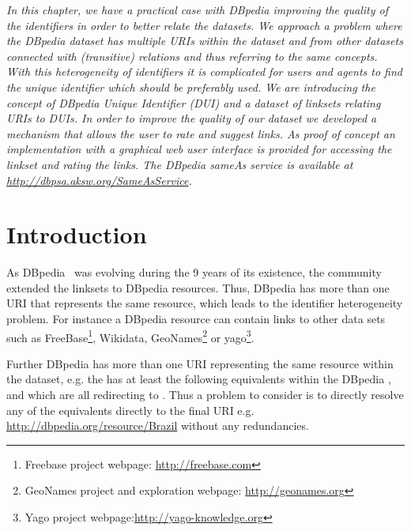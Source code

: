 \textit{In this chapter, we have a practical case with DBpedia improving the quality of the identifiers in order to better relate the datasets. We approach a problem where the DBpedia dataset has multiple URIs within the dataset and from other datasets connected with (transitive)  relations and thus referring to the same concepts.
With this heterogeneity of identifiers it is complicated for users and agents to find the unique identifier which should be preferably used.
We are introducing the concept of DBpedia Unique Identifier (DUI) and a dataset of linksets relating URIs to DUIs.
In order to improve the quality of our dataset we developed a mechanism that allows the user to rate and suggest links.
As proof of concept an implementation with a graphical web user interface is provided for accessing the linkset and rating the links.
The DBpedia sameAs service is available at \url{http://dbpsa.aksw.org/SameAsService}.}

\section{Introduction}


As DBpedia~\cite{dbpedia-swj} was evolving during the 9 years of its existence, the community extended the linksets to DBpedia resources.
Thus, DBpedia has more than one URI that represents the same resource, which leads to the identifier heterogeneity problem. 
For instance a DBpedia resource can contain  links to other data sets such as FreeBase\footnote{Freebase project webpage: \url{http://freebase.com}}, Wikidata, GeoNames\footnote{GeoNames project and exploration webpage: \url{http://geonames.org}} or yago\footnote{Yago project webpage:\url{http://yago-knowledge.org}}.

Further DBpedia has more than one URI representing the same resource within the dataset, e.g. the  has at least the following equivalents within the DBpedia ,  and  which are all redirecting to .
Thus a problem to consider is to directly resolve any of the equivalents directly to the final URI e.g. \url{http://dbpedia.org/resource/Brazil} without any redundancies.

